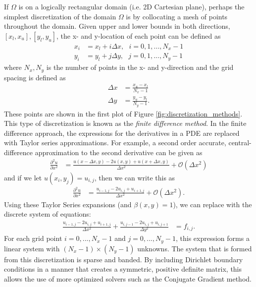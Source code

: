 If $\Omega$ is on a logically rectangular domain (i.e. 2D Cartesian plane), perhaps the simplest discretization of the domain $\Omega$ is by collocating a mesh of points throughout the domain. Given upper and lower bounds in both directions, $[x_l, x_u], [y_l, y_u]$, the x- and y-location of each point can be defined as
\begin{align}
    x_i &= x_l + i \Delta x,\ \ \ i = 0, 1, ..., N_x-1 \\
    y_i &= y_l + j \Delta y,\ \ \ j = 0, 1, ..., N_y-1
\end{align}
where $N_x, N_y$ is the number of points in the x- and y-direction and the grid spacing is defined as
\begin{align}
    \Delta x &= \frac{x_u - x_l}{N_x - 1} \\
    \Delta y &= \frac{y_u - y_l}{N_y - 1}.
\end{align}
These points are shown in the first plot of Figure \ref{fig:discretization_methods}. This type of discretization is known as the {\em finite difference method}. In the finite difference approach, the expressions for the derivatives in a PDE are replaced with Taylor series approximations. For example, a second order accurate, central-difference approximation to the second derivative can be given as
\begin{align}
    \frac{\partial^2 u}{\partial x^2} &= \frac{u(x - \Delta x, y) - 2u(x, y) + u(x + \Delta x, y)}{\Delta x^2} + \mathcal{O}(\Delta x^2)
\end{align}
and if we let $u(x_i, y_j) = u_{i,j}$, then we can write this as
\begin{align}
    \frac{\partial^2 u}{\partial x^2} &= \frac{u_{i-1,j} - 2u_{i,j} + u_{i+1,j}}{\Delta x^2} + \mathcal{O}(\Delta x^2).
\end{align}
Using these Taylor Series expansions (and $\beta(x,y) = 1$), we can replace  with the discrete system of equations:
\begin{align}
    \frac{u_{i-1,j} - 2u_{i,j} + u_{i+1,j}}{\Delta x^2} + \frac{u_{i,j-1} - 2u_{i,j} + u_{i,j+1}}{\Delta y^2} &= f_{i,j}.
    \label{eq:poisson_FD}
\end{align}
For each grid point $i = 0, ..., N_x - 1$ and $j = 0, ..., N_y - 1$, this expression forms a linear system with $(N_x-1) \times (N_y-1)$ unknowns. The system that is formed from this discretization is sparse and banded. By including Dirichlet boundary conditions in a manner that creates a symmetric, positive definite matrix, this allows the use of more optimized solvers such as the Conjugate Gradient method.

